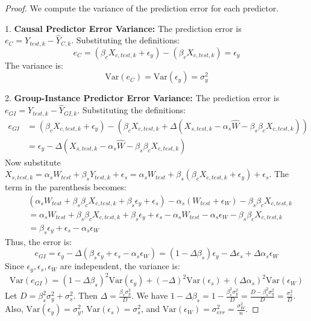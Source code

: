 \documentclass{article}
\theoremstyle{definition}
\theoremstyle{remark}
\newcommand{\Var}{\mathrm{Var}}
\begin{document}
\begin{proof}
We compute the variance of the prediction error for each predictor.

1.  \textbf{Causal Predictor Error Variance:}
    The prediction error is $e_C = Y_{test,k} - \hat{Y}_{C,k}$.
    Substituting the definitions:
    \[ e_C = ( \beta_c X_{c,test,k} + \epsilon_y ) - (\beta_c X_{c,test,k}) = \epsilon_y \]
    The variance is:
    \[ \Var(e_C) = \Var(\epsilon_y) = \sigma_y^2 \]

2.  \textbf{Group-Instance Predictor Error Variance:}
    The prediction error is $e_{GI} = Y_{test,k} - \hat{Y}_{GI,k}$.
    Substituting the definitions:
    \begin{align*} e_{GI} &= (\beta_c X_{c,test,k} + \epsilon_y) - \left( \beta_c X_{c,test,k} + \Delta (X_{s,test,k} - \alpha_s \hat{W} - \beta_s \beta_c X_{c,test,k}) \right) \\ &= \epsilon_y - \Delta (X_{s,test,k} - \alpha_s \hat{W} - \beta_s \beta_c X_{c,test,k}) \end{align*}
    Now substitute $X_{s,test,k} = \alpha_s W_{test} + \beta_s Y_{test,k} + \epsilon_s = \alpha_s W_{test} + \beta_s (\beta_c X_{c,test,k} + \epsilon_y) + \epsilon_s$.
    The term in the parenthesis becomes:
    \begin{align*} & ( \alpha_s W_{test} + \beta_s \beta_c X_{c,test,k} + \beta_s \epsilon_y + \epsilon_s ) - \alpha_s (W_{test} + \epsilon_W) - \beta_s \beta_c X_{c,test,k} \\ &= \alpha_s W_{test} + \beta_s \beta_c X_{c,test,k} + \beta_s \epsilon_y + \epsilon_s - \alpha_s W_{test} - \alpha_s \epsilon_W - \beta_s \beta_c X_{c,test,k} \\ &= \beta_s \epsilon_y + \epsilon_s - \alpha_s \epsilon_W \end{align*}
    Thus, the error is:
    \[ e_{GI} = \epsilon_y - \Delta (\beta_s \epsilon_y + \epsilon_s - \alpha_s \epsilon_W) = (1 - \Delta \beta_s) \epsilon_y - \Delta \epsilon_s + \Delta \alpha_s \epsilon_W \]
    Since $\epsilon_y, \epsilon_s, \epsilon_W$ are independent, the variance is:
    \[ \Var(e_{GI}) = (1 - \Delta \beta_s)^2 \Var(\epsilon_y) + (-\Delta)^2 \Var(\epsilon_s) + (\Delta \alpha_s)^2 \Var(\epsilon_W) \]
    Let $D = \beta_s^2 \sigma_y^2 + \sigma_s^2$. Then $\Delta = \frac{\beta_s \sigma_y^2}{D}$.
    We have $1 - \Delta \beta_s = 1 - \frac{\beta_s^2 \sigma_y^2}{D} = \frac{D - \beta_s^2 \sigma_y^2}{D} = \frac{\sigma_s^2}{D}$.
    Also, $\Var(\epsilon_y) = \sigma_y^2$, $\Var(\epsilon_s) = \sigma_s^2$, and $\Var(\epsilon_W) = \sigma_{err}^2 = \frac{\sigma_W^2}{n}$.

\end{proof}
\end{document}
